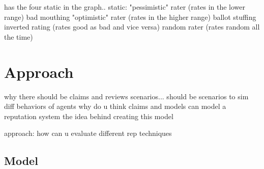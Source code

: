 \documentclass[%
    ]{\PathToTumTemplate/thesis/tum_thesis}
\begin{document}
\cite{yu_detecting_2003} has the four static in the graph..
static:
"pessimistic" rater (rates in the lower range) bad mouthing
"optimistic" rater (rates in the higher range) ballot stuffing
inverted rating (rates good as bad and vice versa)
random rater (rates random all the time)



\chapter{Approach}\label{chap:approach}





why there should be claims and reviews scenarios...
should be scenarios to sim diff behaviors of agents
why do u think claims and models can model a reputation system
the idea behind creating this model

approach: how can u evaluate different rep techniques



\section{Model}\label{sec:approach_model}
\end{document}
